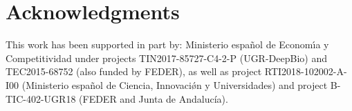 \documentclass[10pt,journal,compsoc]{IEEEtran}
\begin{document}
\section*{Acknowledgments}

This work has been supported in part by: Ministerio espa\~{n}ol de
Econom\'{\i}a y Competitividad under projects  TIN2017-85727-C4-2-P (UGR-DeepBio) and TEC2015-68752 (also funded by FEDER), as well as project RTI2018-102002-A-I00 (Ministerio espa\~{n}ol de Ciencia, Innovaci\'{\o}n y Universidades) and project B-TIC-402-UGR18 (FEDER and Junta de Andaluc\'{i}a).












\end{document}

